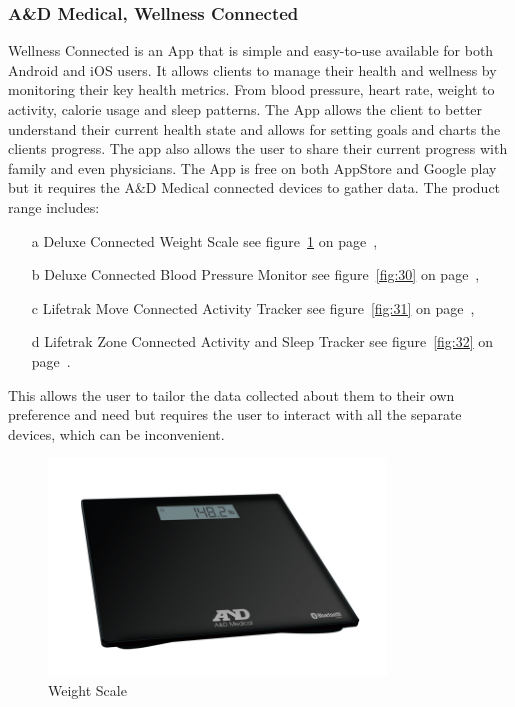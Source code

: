 \documentclass[12pt,]{article}
\numberwithin{figure}{section}
\begin{document}
\subsubsection{A\&D Medical, Wellness Connected}
Wellness Connected is an App that is simple and easy-to-use available for both Android and iOS users. It allows clients to manage their health and wellness by monitoring their key health metrics. From blood pressure, heart rate, weight to activity, calorie usage and sleep patterns. The App allows the client to better understand their current health state and allows for setting goals and charts the clients progress. The app also allows the user to share their current progress with family and even physicians. The App is free on both AppStore and Google play but it requires the A\&D Medical connected devices to gather data. The product range includes:
\begin{itemize}
\item[a] Deluxe Connected Weight Scale see figure~\ref{fig:8} on page~\pageref{fig:8},
\item[b] Deluxe Connected Blood Pressure Monitor see figure~\ref{fig:30} on page~\pageref{fig:30},
\item[c] Lifetrak Move Connected Activity Tracker see figure~\ref{fig:31} on page~\pageref{fig:31},
\item[d] Lifetrak Zone Connected Activity and Sleep Tracker see figure~\ref{fig:32} on page~\pageref{fig:32}.
\end{itemize}
This allows the user to tailor the data collected about them to their own preference and need but requires the user to interact with all the separate devices, which can be inconvenient.
\begin{figure}[h]
  	\begin{center}
    	\includegraphics[width=0.8\textwidth]{5}
   	\end{center}
  	\caption{Weight Scale \cite{AND}}
	\label{fig:8}
\end{figure}
\end{document}
